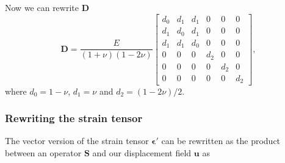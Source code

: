 \documentclass[acmtog]{acmart}
\begin{document}
Now we can rewrite $\boldsymbol D$
%
\begin{equation}
  \boldsymbol D = \frac{E}{(1+\nu)(1-2\nu)}\begin{bmatrix}
    d_0 & d_1 & d_1 & 0   & 0   & 0   \\
    d_1 & d_0 & d_1 & 0   & 0   & 0   \\
    d_1 & d_1 & d_0 & 0   & 0   & 0   \\
    0   & 0   & 0   & d_2 & 0   & 0   \\
    0   & 0   & 0   & 0   & d_2 & 0   \\
    0   & 0   & 0   & 0   & 0   & d_2
  \end{bmatrix},
\end{equation}
%
where $d_0 = 1- \nu$, $d_1 = \nu$ and $d_2 = (1-2\nu) / 2$.

\subsubsection*{Rewriting the strain tensor}
The vector version of the strain tensor $\boldsymbol \epsilon'$ can be rewritten as the product between an operator $\boldsymbol S$ and our displacement field $\boldsymbol u$ as
\end{document}
